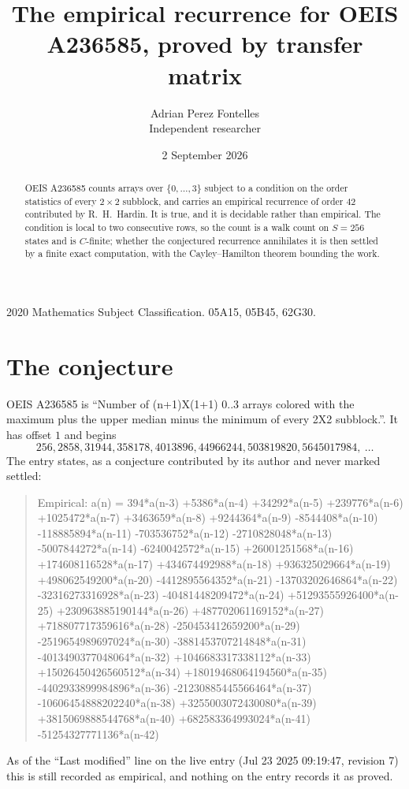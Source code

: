 \documentclass[11pt,a4paper]{article}
\title{The empirical recurrence for OEIS A236585, proved by transfer matrix}
\author{Adrian Perez Fontelles\\ \small Independent researcher}
\date{2 September 2026}
\theoremstyle{plain}
\theoremstyle{definition}
\begin{document}
\maketitle

\begin{abstract}
OEIS A236585 counts arrays over $\{0,\dots,3\}$ subject to a condition on the order
statistics of every $2\times2$ subblock, and carries an empirical recurrence of order
$42$ contributed by R.~H.~Hardin. It is true, and it is decidable rather than empirical.
The condition is local to two consecutive rows, so the count is a walk count on $S=256$
states and is $C$-finite; whether the conjectured recurrence annihilates it is then settled by
a finite exact computation, with the Cayley--Hamilton theorem bounding the work.
\end{abstract}

\noindent\small 2020 Mathematics Subject Classification. 05A15, 05B45, 62G30.\normalsize

\section{The conjecture}

OEIS A236585 is ``Number of (n+1)X(1+1) 0..3 arrays colored with the maximum plus the upper median minus the minimum of every 2X2 subblock.''. It has offset $1$ and begins
\[
256, 2858, 31944, 358178, 4013896, 44966244, 503819820, 5645017984,\ \dots
\]
The entry states, as a conjecture contributed by its author and never marked settled:
\begin{quote}
Empirical: a(n) = 394*a(n-3) +5386*a(n-4) +34292*a(n-5) +239776*a(n-6) +1025472*a(n-7) +3463659*a(n-8) +9244364*a(n-9) -8544408*a(n-10) -118885894*a(n-11) -703536752*a(n-12) -2710828048*a(n-13) -5007844272*a(n-14) -6240042572*a(n-15) +26001251568*a(n-16) +174608116528*a(n-17) +434674492988*a(n-18) +936325029664*a(n-19) +498062549200*a(n-20) -4412895564352*a(n-21) -13703202646864*a(n-22) -32316273316928*a(n-23) -40481448209472*a(n-24) +51293555926400*a(n-25) +230963885190144*a(n-26) +487702061169152*a(n-27) +718807717359616*a(n-28) -250453412659200*a(n-29) -2519654989697024*a(n-30) -3881453707214848*a(n-31) -4013490377048064*a(n-32) +1046683317338112*a(n-33) +15026450426560512*a(n-34) +18019468064194560*a(n-35) -4402933899984896*a(n-36) -21230885445566464*a(n-37) -10606454888202240*a(n-38) +3255003072430080*a(n-39) +3815069888544768*a(n-40) +682583364993024*a(n-41) -51254327771136*a(n-42)
\end{quote}
As of the ``Last modified'' line on the live entry (Jul 23 2025 09:19:47, revision 7) this is still
recorded as empirical, and nothing on the entry records it as proved.
\end{document}
